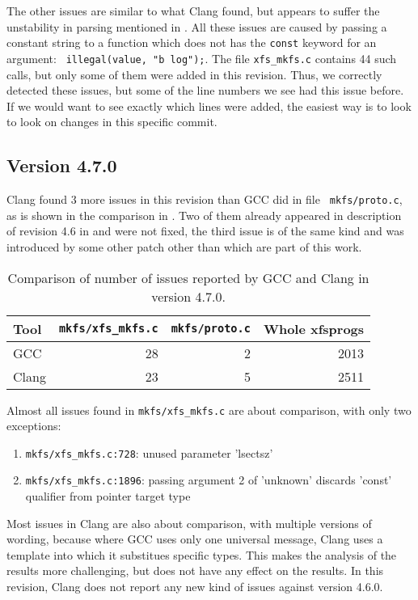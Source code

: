 The other issues are similar to what Clang found, but appears to suffer the
unstability in parsing mentioned in .
All these issues are caused by passing a constant string to a
function which does not has the {\tt const} keyword for an argument: {\tt
illegal(value, "b log");}. The file {\tt xfs\_mkfs.c} contains 44 such
calls, but only some of them were added in this revision. Thus, we correctly
detected these issues, but some of the line numbers we see had this issue
before. If we would want to see exactly which lines were added, the easiest way
is to look to look on changes in this specific commit.


\subsection{Version 4.7.0}\label{chap:results:gcc:4.7}

Clang found 3 more issues in this revision than GCC did in file {\tt
mkfs/proto.c}, as is shown in the comparison in . Two
of them already appeared in description of revision 4.6 in
 and were not fixed, the third issue is of the same
kind and was introduced by some other patch other than which are part of this
work.

\begin{table}[h]
\begin{tabular}{|l||r|r||r|}
\hline
Tool & {\tt mkfs/xfs\_mkfs.c} & {\tt mkfs/proto.c} & Whole xfsprogs \\
\hline
GCC & 28 & 2 & 2013 \\
\hline
Clang & 23 & 5 & 2511 \\
\hline
\end{tabular}
\caption{Comparison of number of issues reported by GCC and Clang in version
4.7.0.}
\label{tab:results:gcc:4.7}
\end{table}

Almost all issues found in {\tt mkfs/xfs\_mkfs.c} are about comparison, with
only two exceptions:
\begin{enumerate}
	\item {\tt mkfs/xfs\_mkfs.c:728}: unused parameter 'lsectsz'
	\item {\tt mkfs/xfs\_mkfs.c:1896}: passing argument 2 of 'unknown'
		discards 'const' qualifier from pointer target type
\end{enumerate}


Most issues in Clang are also about comparison, with multiple versions of
wording, because where GCC uses only one universal message, Clang uses a
template into which it substitues specific types. This makes the analysis of
the results more challenging, but does not have any effect on the results.
In this revision, Clang does not report any new kind of issues against version
4.6.0.

